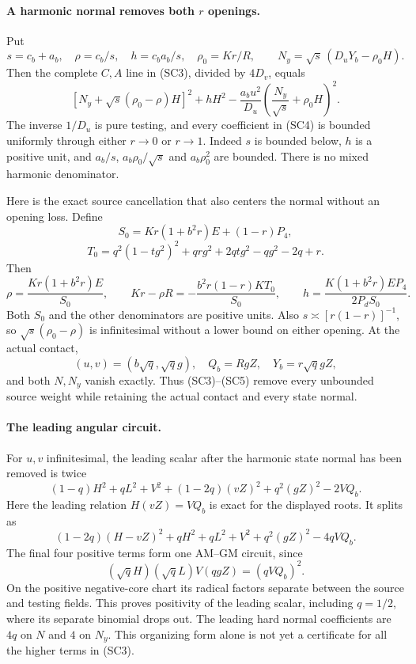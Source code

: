 \paragraph{A harmonic normal removes both $r$ openings.}
Put
\[
 s=c_b+a_b,\quad \rho=c_b/s,\quad h=c_ba_b/s,
 \quad \rho_0=Kr/R,\qquad
 N_y=\sqrt{s}\,(D_uY_b-\rho_0H).
\]
Then the complete $C,A$ line in (SC3), divided by $4D_v$, equals
\[
 \left[N_y+\sqrt{s}(\rho_0-\rho)H\right]^2+hH^2
 -\frac{a_bu^2}{D_u}
           \left(\frac{N_y}{\sqrt{s}}+\rho_0H\right)^2.
 \tag{SC4}
\]
The inverse $1/D_u$ is pure testing, and every coefficient in (SC4)
is bounded uniformly through either $r\to0$ or $r\to1$.
Indeed $s$ is bounded below, $h$ is a positive unit, and
$a_b/s$, $a_b\rho_0/\sqrt{s}$ and $a_b\rho_0^2$ are bounded.
There is no mixed harmonic denominator.

Here is the exact source cancellation that also centers the normal
without an opening loss. Define
\[
 S_0=Kr(1+b^2r)E+(1-r)P_4,
\]
\[
 T_0=q^2(1-tg^2)^2+qrg^2+2qtg^2-qg^2-2q+r.
\]
Then
\[
 \rho=\frac{Kr(1+b^2r)E}{S_0},\qquad
 Kr-\rho R=-\frac{b^2r(1-r)K T_0}{S_0},\qquad
 h=\frac{K(1+b^2r)E P_4}{2P_dS_0}.             \tag{SC5}
\]
Both $S_0$ and the other denominators are positive units. Also
$s\asymp[r(1-r)]^{-1}$, so $\sqrt{s}(\rho_0-\rho)$ is
infinitesimal without a lower bound on either opening.
At the actual contact,
\[
 (u,v)=(b\sqrt q,\sqrt q g),\quad
 Q_b=RgZ,\quad Y_b=r\sqrt q gZ,
\]
and both $N,N_y$ vanish exactly. Thus (SC3)--(SC5) remove every
unbounded source weight while retaining the actual contact and every
state normal.

\paragraph{The leading angular circuit.}
For $u,v$ infinitesimal, the leading scalar after the harmonic state
normal has been removed is twice
\[
 (1-q)H^2+qL^2+V^2+(1-2q)(vZ)^2+q^2(gZ)^2-2VQ_b.
\]
Here the leading relation $H(vZ)=VQ_b$ is exact for the displayed
roots. It splits as
\[
 (1-2q)(H-vZ)^2+
 qH^2+qL^2+V^2+q^2(gZ)^2-4qVQ_b.              \tag{SC6}
\]
The final four positive terms form one AM--GM circuit, since
\[
 (\sqrt qH)(\sqrt qL)V(qgZ)=(qVQ_b)^2.
\]
On the positive negative-core chart its radical factors separate
between the source and testing fields. This proves positivity of the
leading scalar, including $q=1/2$, where its separate binomial drops
out. The leading hard normal coefficients are $4q$ on $N$ and $4$
on $N_y$. This organizing form alone is not yet a certificate for
all the higher terms in (SC3).

